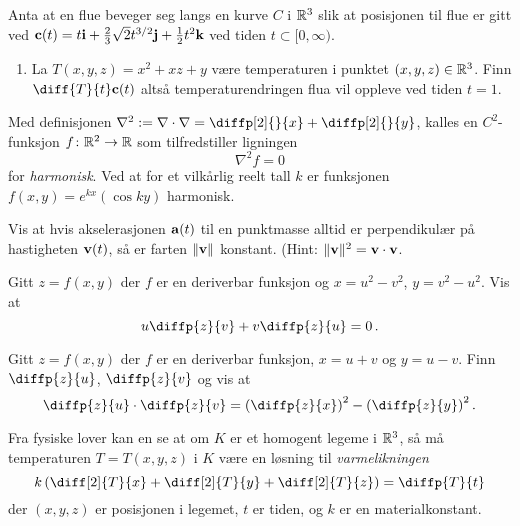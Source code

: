 


\oppgave[V2016, Oppgave 2] Anta at en flue beveger seg langs en kurve $C$ i
$\mathbb{R}^3$ slik at posisjonen til flue er gitt ved $\mathbf{c}(t) = t \mathbf{i} +
\frac{2}{3}\sqrt{2} t^{3/2} \mathbf{j} + \frac{1}{2}t^2 \mathbf{k}$ ved tiden $t
\subset [0, \infty)$.
    
\begin{enumerate}
  \item La $T(x,y,z) = x^2 + xz + y$ være temperaturen i punktet $(x,y,z) \in
    \mathbb{R}^3$. Finn $\diff{T}{t} \vek{c}(t)$ altså temperaturendringen flua vil
    oppleve ved tiden $t = 1$.
\end{enumerate}

\oppgave[V2016, Oppgave 6] Med definisjonen $\nabla^2 := \nabla \cdot \nabla =
\diffp[2]{}{x} + \diffp[2]{}{y}$, kalles en $C^2$-funksjon $f \colon \mathbb{R}^2 \to
\mathbb{R}$ som tilfredstiller ligningen
%
\begin{equation*}
  \nabla^2 f = 0
\end{equation*}
%
for \emph{harmonisk}. Ved at for et vilkårlig reelt tall $k$ er funksjonen
$f(x,y) = e^{kx}(\cos ky)$ harmonisk.


\oppgave[V2015, Oppgave 4] Vis at hvis akselerasjonen $\mathbf{a}(t)$ til en
punktmasse alltid er perpendikulær på hastigheten $\mathbf{v}(t)$, så er farten
$\lVert\mathbf{v}\rVert$ konstant. (Hint: $\lVert\mathbf{v}\rVert^2 = \mathbf{v} \cdot \mathbf{v}$.


\oppgave[K2014, Oppgave 2] Gitt $z = f(x, y)$ der $f$ er en deriverbar funksjon
og $x = u^2 - v^2$, $y = v^2 - u^2$. Vis at
%
\begin{equation*}
  u \diffp{z}{v} + v \diffp{z}{u} = 0\,.
\end{equation*}

\oppgave[V2014, Oppgave 1] Gitt $z = f(x,y)$ der $f$ er en deriverbar funksjon,
$x = u + v$ og $y = u - v$. Finn $\diffp{z}{u}$, $\diffp{z}{v}$ og vis at
%
\begin{equation*}
  \diffp{z}{u} \cdot \diffp{z}{v}
  = \left( \diffp{z}{x} \right)^2 - \left( \diffp{z}{y} \right)^2.
\end{equation*}

\oppgave[V2013, Oppgave 1] Fra fysiske lover kan en se at om $K$ er et homogent
legeme i $\mathbb{R}^3$, så må temperaturen $T = T(x,y,z)$ i $K$ være en løsning til
\emph{varmelikningen}
%
\begin{equation*}
  k \left( \diff[2]{T}{x} + \diff[2]{T}{y} + \diff[2]{T}{z} \right)
  = \diffp{T}{t}
\end{equation*}
%
der $(x,y,z)$ er posisjonen i legemet, $t$ er tiden, og $k$ er en
materialkonstant. \medskip

